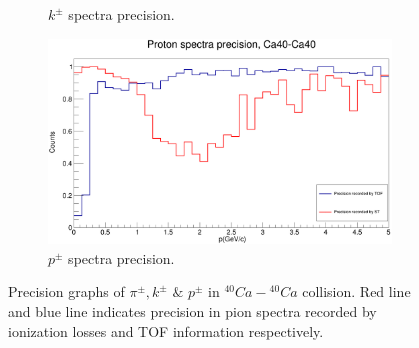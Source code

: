\documentclass[12pt, twocolumn]{article}
\begin{document}
\begin{figure}[H]
\begin{subfigure}[h]{0.49\textwidth}
\caption{$k^{\pm}$ spectra precision.}
\label{Kaon spectra precision, Ca40.}
\end{subfigure}
\par
\vspace{1.3cm}
\begin{subfigure}[h]{0.49\textwidth}
\centering
\includegraphics[scale=0.14]{ProtonSpectraPrecision_Ca.png}
\caption{$p^{\pm}$ spectra precision.}
\label{Proton spectra precision, Ca40}
\end{subfigure}
\caption{Precision graphs of $\pi^{\pm}, k^{\pm}$ $\&$ $p^{\pm}$ in $^{40}Ca-{^{40}Ca}$ collision. Red line and blue line indicates precision in pion spectra recorded by ionization losses and TOF information respectively.}
\label{Precision graphs of pions, kaons, and protons in Ca40-Ca40 collision. Red line and blue line shows precision in pion spectra recorded by ST, and TOF respectively.}
\vspace{2.5cm}
\end{figure}


\end{document}
